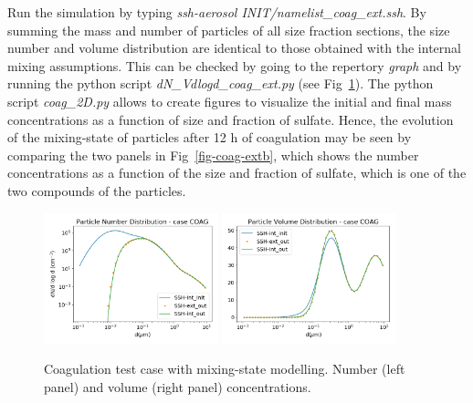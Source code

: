\documentclass[a4paper,11pt]{article}
\begin{document}
{{Run the simulation by typing {\it{ssh-aerosol INIT/namelist\_coag\_ext.ssh}}.
By summing the mass and number of particles of all size fraction sections, the
size number and volume distribution are identical to those obtained with the
internal mixing assumptions. This can be checked by going to the repertory
{\it{graph}} and by running the python script {\it{dN\_Vdlogd\_coag\_ext.py}}
(see Fig~\ref{fig-coag-ext}).
The python script {\it{coag\_2D.py}} allows to create figures to visualize the initial and final mass concentrations as a function of size and fraction of sulfate.
Hence, the evolution of the mixing-state of particles after 12 h of coagulation may
be seen by comparing the two panels in Fig~\ref{fig-coag-extb}, which shows
the number concentrations as a function of the size and fraction of 
sulfate, which is one of the
two compounds of the particles.

\begin{figure}[H]
        \begin{center}
                \includegraphics[angle=0,width=0.45\textwidth]{../graph/figure_ref/dNdlogd_COAG_EXT.png}
                \includegraphics[angle=0,width=0.45\textwidth]{../graph/figure_ref/dVdlogd_COAG_EXT.png}
        \end{center}
\caption{Coagulation test case with mixing-state modelling. Number (left panel) and volume (right panel) concentrations.}
\label{fig-coag-ext}
\end{figure}
 
}}
\end{document}
